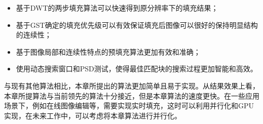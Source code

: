 \begin{itemize}
 \item 基于DWT的两步填充算法可以快速得到原分辨率下的填充结果；
 \item 基于GST确定的填充优先级可以有效保证填充后图像可以很好的保持明显结构的连续性；
\item 基于图像局部和连续性特点的预填充算法更加有效和准确；
\item 使用动态搜索窗口和PSD测试，使得最佳匹配块的搜索过程更加智能和高效。
 \end{itemize}
\par
与现有其他算法相比，本章所提出的算法更加简单且易于实现。从结果效果上看，本章所提算法与当前领先的算法\cite{LeMeur:2012,Xu:2010}十分接近，但是本章算法的速度更快。在一些应用场景下，例如在线图像编辑等，需要实现实时填充，这时可以利用并行化和GPU实现\cite{kwokFast}，在未来工作中，可以考虑将本章算法进行并行化。